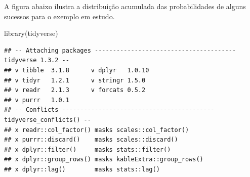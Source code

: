 \documentclass[
]{book}
\newenvironment{Shaded}{\begin{snugshade}}{\end{snugshade}}
\newcommand{\FunctionTok}[1]{\textcolor[rgb]{0.00,0.00,0.00}{#1}}
\newcommand{\NormalTok}[1]{#1}
\begin{document}
\hfill\break

A figura abaixo ilustra a distribuição acumulada das probabilidades de alguns sucessos para o exemplo em estudo.\\

\begin{Shaded}
\begin{Highlighting}[]
\FunctionTok{library}\NormalTok{(tidyverse)}
\end{Highlighting}
\end{Shaded}

\begin{verbatim}
## -- Attaching packages --------------------------------------- tidyverse 1.3.2 --
## v tibble  3.1.8      v dplyr   1.0.10
## v tidyr   1.2.1      v stringr 1.5.0 
## v readr   2.1.3      v forcats 0.5.2 
## v purrr   1.0.1      
## -- Conflicts ------------------------------------------ tidyverse_conflicts() --
## x readr::col_factor() masks scales::col_factor()
## x purrr::discard()    masks scales::discard()
## x dplyr::filter()     masks stats::filter()
## x dplyr::group_rows() masks kableExtra::group_rows()
## x dplyr::lag()        masks stats::lag()
\end{verbatim}
\end{document}
